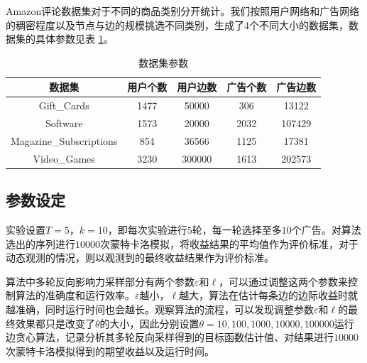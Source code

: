 Amazon评论数据集对于不同的商品类别分开统计。我们按照用户网络和广告网络的稠密程度以及节点与边的规模挑选不同类别，生成了4个不同大小的数据集，数据集的具体参数见表 \ref{tab:imdata}。

\begin{table}[htbp]
	\setlength{\tabcolsep}{2mm}{}
	\centering
	\normalsize
	\caption{数据集参数}\label{tab:imdata}
	\begin{tabular}[t]{|c|c|c|c|c|}
        \hline
		数据集 & 用户个数 & 用户边数 & 广告个数 & 广告边数 \\ \hline
		Gift\_Cards & 1477 & 50000 & 306 & 13122 \\ \hline
		Software & 1573 & 20000 & 2032 & 107429 \\ \hline
		Magazine\_Subscriptions & 854 & 36566 & 1125 & 17381 \\ \hline
		Video\_Games & 3230 & 300000 & 1613 & 202573 \\ \hline
	\end{tabular}	
\end{table}

\subsection{参数设定}

实验设置$T=5$，$k=10$，即每次实验进行$5$轮，每一轮选择至多$10$个广告。对算法选出的序列进行$10000$次蒙特卡洛模拟，将收益结果的平均值作为评价标准，对于动态观测的情况，则以观测到的最终收益结果作为评价标准。

算法中多轮反向影响力采样部分有两个参数$\varepsilon$和$\ell$，可以通过调整这两个参数来控制算法的准确度和运行效率。$\varepsilon$越小，$\ell$越大，算法在估计每条边的边际收益时就越准确，同时运行时间也会越长。观察算法的流程，可以发现调整参数$\varepsilon$和$\ell$的最终效果都只是改变了$\theta$的大小，因此分别设置$\theta=10,100,1000,10000,100000$运行边贪心算法，记录分析其多轮反向采样得到的目标函数估计值、对结果进行$10000$次蒙特卡洛模拟得到的期望收益以及运行时间。

